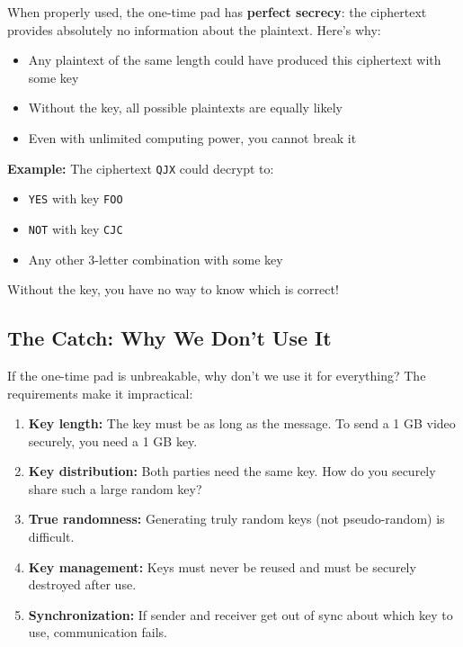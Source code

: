 \documentclass[11pt,a4paper]{report}
\begin{document}
When properly used, the one-time pad has \textbf{perfect secrecy}: the ciphertext provides absolutely no information about the plaintext. Here's why:

\begin{itemize}
\item Any plaintext of the same length could have produced this ciphertext with some key
\item Without the key, all possible plaintexts are equally likely
\item Even with unlimited computing power, you cannot break it
\end{itemize}

\textbf{Example:} The ciphertext \verb|QJX| could decrypt to:
\begin{itemize}
\item \verb|YES| with key \verb|FOO|
\item \verb|NOT| with key \verb|CJC|
\item Any other 3-letter combination with some key
\end{itemize}

Without the key, you have no way to know which is correct!

\subsection{The Catch: Why We Don't Use It}

If the one-time pad is unbreakable, why don't we use it for everything? The requirements make it impractical:

\begin{enumerate}
\item \textbf{Key length:} The key must be as long as the message. To send a 1 GB video securely, you need a 1 GB key.

\item \textbf{Key distribution:} Both parties need the same key. How do you securely share such a large random key?

\item \textbf{True randomness:} Generating truly random keys (not pseudo-random) is difficult.

\item \textbf{Key management:} Keys must never be reused and must be securely destroyed after use.

\item \textbf{Synchronization:} If sender and receiver get out of sync about which key to use, communication fails.
\end{enumerate}
\end{document}
